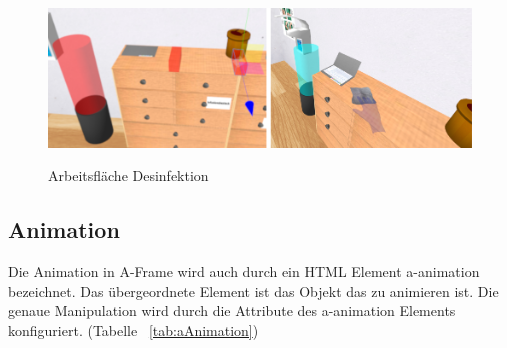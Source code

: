  \begin{figure}[ht]
\vspace*{1.8em}
\centering
\caption[Arbeitsfläche Desinfektion]{Arbeitsfläche Desinfektion}
\includegraphics[width=\textwidth]{images/arbeitsflaescheDesinfektion.png}
\label{fig:arbeitsflaescheDesinfektion} 
\end{figure}
 
 \subsection{Animation}
 Die Animation in A-Frame wird auch durch ein HTML Element {\selectfont a-animation} bezeichnet. Das übergeordnete Element ist das Objekt das zu animieren ist. Die genaue Manipulation wird durch die Attribute des {\selectfont a-animation} Elements konfiguriert. (Tabelle ~\ref{tab:aAnimation})
 
